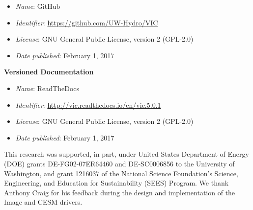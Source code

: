 \documentclass[gmd, manuscript]{copernicus}
\begin{document}
\begin{itemize}
	\item \textit{Name}: GitHub
	\item \textit{Identifier}: \url{https://github.com/UW-Hydro/VIC}
	\item \textit{License}: GNU General Public License, version 2 (GPL-2.0)
	\item \textit{Date published}: February 1, 2017
\end{itemize}

{\bf Versioned Documentation}

\begin{itemize}
	\item \textit{Name}: ReadTheDocs
	\item \textit{Identifier}: \url{http://vic.readthedocs.io/en/vic.5.0.1}
	\item \textit{License}: GNU General Public License, version 2 (GPL-2.0)
	\item \textit{Date published}: February 1, 2017
\end{itemize}



\begin{acknowledgements}
  This research was supported, in part, under United States Department of Energy (DOE) grants DE-FG02-07ER64460 and DE-SC0006856 to the University of Washington, and grant 1216037 of the National Science Foundation's Science, Engineering, and Education for Sustainability (SEES) Program.
  We thank Anthony Craig for his feedback during the design and implementation of the Image and CESM drivers.
\end{acknowledgements}




%
%
%
\end{document}
